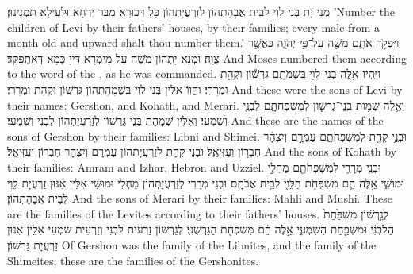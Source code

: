 {מְנִי יָת בְּנֵי לֵוִי לְבֵית אֲבָהָתְהוֹן לְזַרְעֲיָתְהוֹן כָּל דְּכוּרָא מִבַּר יַרְחָא וּלְעֵילָא תִּמְנֵינוּן׃}
{’Number the children of Levi by their fathers’ houses, by their families; every male from a month old and upward shalt thou number them.’}{}
{וַיִּפְקֹ֥ד אֹתָ֛ם מֹשֶׁ֖ה עַל־פִּ֣י יְהֹוָ֑ה כַּאֲשֶׁ֖ר צֻוָּֽה׃
}
{וּמְנָא יָתְהוֹן מֹשֶׁה עַל מֵימְרָא דַּייָ כְּמָא דְּאִתְפַּקַּד׃}
{And Moses numbered them according to the word of the \lord, as he was commanded.}{}
{וַיִּֽהְיוּ־אֵ֥לֶּה בְנֵֽי־לֵוִ֖י בִּשְׁמֹתָ֑ם גֵּרְשׁ֕וֹן וּקְהָ֖ת וּמְרָרִֽי׃}
{וַהֲווֹ אִלֵּין בְּנֵי לֵוִי בִּשְׁמָהָתְהוֹן גֵּרְשׁוֹן וּקְהָת וּמְרָרִי׃}
{And these were the sons of Levi by their names: Gershon, and Kohath, and Merari.}{}
{וְאֵ֛לֶּה שְׁמ֥וֹת בְּֽנֵי־גֵרְשׁ֖וֹן לְמִשְׁפְּחֹתָ֑ם לִבְנִ֖י וְשִׁמְעִֽי׃}
{וְאִלֵּין שְׁמָהָת בְּנֵי גֵּרְשׁוֹן לְזַרְעֲיָתְהוֹן לִבְנִי וְשִׁמְעִי׃}
{And these are the names of the sons of Gershon by their families: Libni and Shimei.}{}
{וּבְנֵ֥י קְהָ֖ת לְמִשְׁפְּחֹתָ֑ם עַמְרָ֣ם וְיִצְהָ֔ר חֶבְר֖וֹן וְעֻזִּיאֵֽל׃}
{וּבְנֵי קְהָת לְזַרְעֲיָתְהוֹן עַמְרָם וְיִצְהָר חֶבְרוֹן וְעֻזִּיאֵל׃}
{And the sons of Kohath by their families: Amram and Izhar, Hebron and Uzziel.}{}
{וּבְנֵ֧י מְרָרִ֛י לְמִשְׁפְּחֹתָ֖ם מַחְלִ֣י וּמוּשִׁ֑י אֵ֥לֶּה הֵ֛ם מִשְׁפְּחֹ֥ת הַלֵּוִ֖י לְבֵ֥ית אֲבֹתָֽם׃}
{וּבְנֵי מְרָרִי לְזַרְעֲיָתְהוֹן מַחְלִי וּמוּשִׁי אִלֵּין אִנּוּן זַרְעֲיָת לֵוִי לְבֵית אֲבָהָתְהוֹן׃}
{And the sons of Merari by their families: Mahli and Mushi. These are the families of the Levites according to their fathers’ houses.}{}
{לְגֵ֣רְשׁ֔וֹן מִשְׁפַּ֙חַת֙ הַלִּבְנִ֔י וּמִשְׁפַּ֖חַת הַשִּׁמְעִ֑י אֵ֣לֶּה הֵ֔ם מִשְׁפְּחֹ֖ת הַגֵּרְשֻׁנִּֽי׃
}
{לְגֵרְשׁוֹן זַרְעִית לִבְנִי וְזַרְעִית שִׁמְעִי אִלֵּין אִנּוּן זַרְעֲיָת גֵּרְשׁוֹן׃}
{Of Gershon was the family of the Libnites, and the family of the Shimeites; these are the families of the Gershonites.}{}
